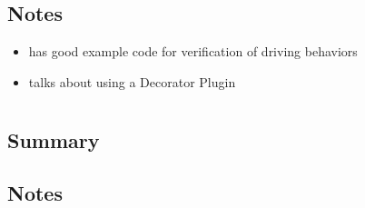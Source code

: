 \documentclass{article}
\begin{document}
	\subsection{Notes}
	\begin{itemize}
	\item has good example code for verification of driving behaviors
	\item talks about using a Decorator Plugin
	\end{itemize}
	\newpage

\section{}
	\subsection{Summary}
	\subsection{Notes}
	\begin{itemize}
	\end{itemize}
	\newpage
\end{document}
